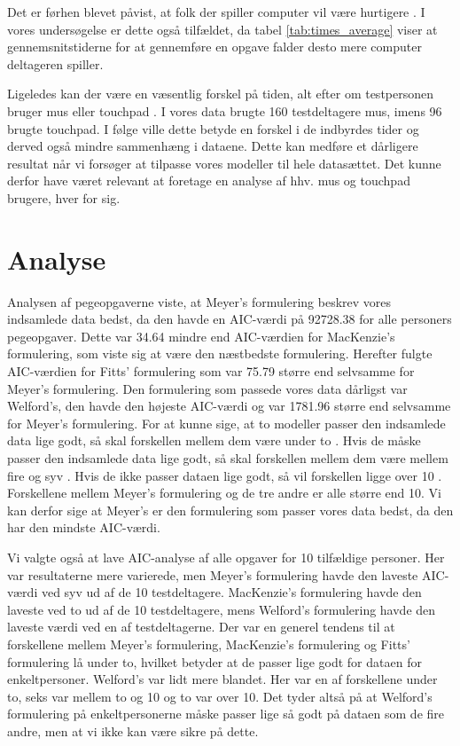 Det er førhen blevet påvist, at folk der spiller computer vil være hurtigere \cite{wyeld2013}. I vores undersøgelse er dette også tilfældet, da tabel \ref{tab:times_average} viser at gennemsnitstiderne for at gennemføre en opgave falder desto mere computer deltageren spiller.

Ligeledes kan der være en væsentlig forskel på tiden, alt efter om testpersonen bruger mus eller touchpad \cite{epps1986}. I vores data brugte 160 testdeltagere mus, imens 96 brugte touchpad. I følge \cite{epps1986} ville dette betyde en forskel i de indbyrdes tider og derved også mindre sammenhæng i dataene. Dette kan medføre et dårligere resultat når vi forsøger at tilpasse vores modeller til hele datasættet. Det kunne derfor have været relevant at foretage en analyse af hhv. mus og touchpad brugere, hver for sig.

\section*{Analyse}
Analysen af pegeopgaverne viste, at Meyer's formulering beskrev vores indsamlede data bedst, da den havde en AIC-værdi på 92728.38 for alle personers pegeopgaver. Dette var 34.64 mindre end AIC-værdien for MacKenzie's formulering, som viste sig at være den næstbedste formulering. Herefter fulgte AIC-værdien for Fitts' formulering som var 75.79 større end selvsamme for Meyer's formulering. Den formulering som passede vores data dårligst var Welford's, den havde den højeste AIC-værdi og var 1781.96 større end selvsamme for Meyer's formulering. For at kunne sige, at to modeller passer den indsamlede data lige godt, så skal forskellen mellem dem være under to \cite{burnham2004}. Hvis de måske passer den indsamlede data lige godt, så skal forskellen mellem dem være mellem fire og syv \cite{burnham2004}. Hvis de ikke passer dataen lige godt, så vil forskellen ligge over 10 \cite{burnham2004}. Forskellene mellem Meyer's formulering og de tre andre er alle større end 10. Vi kan derfor sige at Meyer's er den formulering som passer vores data bedst, da den har den mindste AIC-værdi.

Vi valgte også at lave AIC-analyse af alle opgaver for 10 tilfældige personer. Her var resultaterne mere varierede, men Meyer's formulering havde den laveste AIC-værdi ved syv ud af de 10 testdeltagere. MacKenzie's formulering havde den laveste ved to ud af de 10 testdeltagere, mens Welford's formulering havde den laveste værdi ved en af testdeltagerne. Der var en generel tendens til at forskellene mellem Meyer's formulering, MacKenzie's formulering og Fitts' formulering lå under to, hvilket betyder at de passer lige godt for dataen for enkeltpersoner. Welford's var lidt mere blandet. Her var en af forskellene under to, seks var mellem to og 10 og to var over 10. Det tyder altså på at Welford's formulering på enkeltpersonerne måske passer lige så godt på dataen som de fire andre, men at vi ikke kan være sikre på dette.

